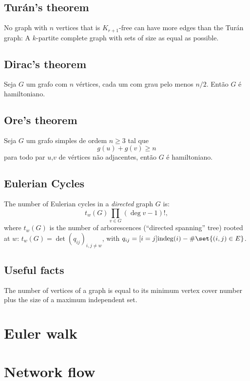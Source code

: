 \subsection{Turán's theorem} No graph with $n$ vertices that is $K_{r+1}$-free can have more edges than the Turán graph: A $k$-partite complete graph with sets of size as equal as possible.

\subsection{Dirac's theorem} Seja $G$ um grafo com $n$ vértices, cada um com grau pelo menos $n/2$. Então $G$ é hamiltoniano.

\subsection{Ore's theorem} Seja $G$ um grafo simples de ordem $n \geq 3$ tal que 
\[g(u) + g(v) \geq n \] para todo par $u$,$v$ de vértices não adjacentes, então $G$ é hamiltoniano.

\subsection{Eulerian Cycles}
The number of Eulerian cycles in a \emph{directed} graph $G$ is:\newline
		\begin{equation*}
			t_w(G) \prod_{v \in G} (\deg v - 1)!,
		\end{equation*}\newline
		where $t_w(G)$ is the number of arborescences (``directed spanning'' tree) rooted at $w$: $t_w(G) = \det\left( q_{ij} \right)_{i,j \neq w}$, with $q_{ij} = [i=j] \mathrm{indeg}(i) - \# \set{(i,j) \in E}$.\newline
	
\subsection{Useful facts}
The number of vertices of a graph is equal to its minimum vertex cover number plus the size of a maximum independent set.\\

\section{Euler walk}

\section{Network flow}
    \newline    
